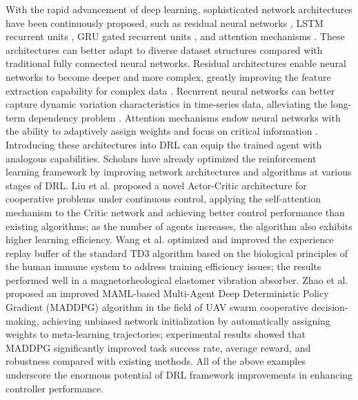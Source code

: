 \documentclass[review]{elsarticle}
\begin{document}
With the rapid advancement of deep learning, sophisticated network architectures have been continuously proposed, such as residual neural networks \citep{he_deep_2016}, LSTM recurrent units \citep{hochreiter_long_1997}, GRU gated recurrent units \citep{chung_empirical_2014}, and attention mechanisms \citep{vaswani_attention_2017}. These architectures can better adapt to diverse dataset structures compared with traditional fully connected neural networks. Residual architectures enable neural networks to become deeper and more complex, greatly improving the feature extraction capability for complex data \citep{he_deep_2016}. Recurrent neural networks can better capture dynamic variation characteristics in time-series data, alleviating the long-term dependency problem \citep{hochreiter_long_1997,chung_empirical_2014}. Attention mechanisms endow neural networks with the ability to adaptively assign weights and focus on critical information \citep{vaswani_attention_2017}. Introducing these architectures into DRL can equip the trained agent with analogous capabilities. Scholars have already optimized the reinforcement learning framework by improving network architectures and algorithms at various stages of DRL. Liu et al. \citep{liu_self-attention-based_2022} proposed a novel Actor-Critic architecture for cooperative problems under continuous control, applying the self-attention mechanism to the Critic network and achieving better control performance than existing algorithms; as the number of agents increases, the algorithm also exhibits higher learning efficiency. Wang et al. \citep{wang_immune_2024} optimized and improved the experience replay buffer of the standard TD3 algorithm based on the biological principles of the human immune system to address training efficiency issues; the results performed well in a magnetorheological elastomer vibration absorber. Zhao et al. \citep{zhao_mw-maddpg_2023} proposed an improved MAML-based Multi-Agent Deep Deterministic Policy Gradient (MADDPG) algorithm in the field of UAV swarm cooperative decision-making, achieving unbiased network initialization by automatically assigning weights to meta-learning trajectories; experimental results showed that MADDPG significantly improved task success rate, average reward, and robustness compared with existing methods. All of the above examples underscore the enormous potential of DRL framework improvements in enhancing controller performance.
\end{document}
